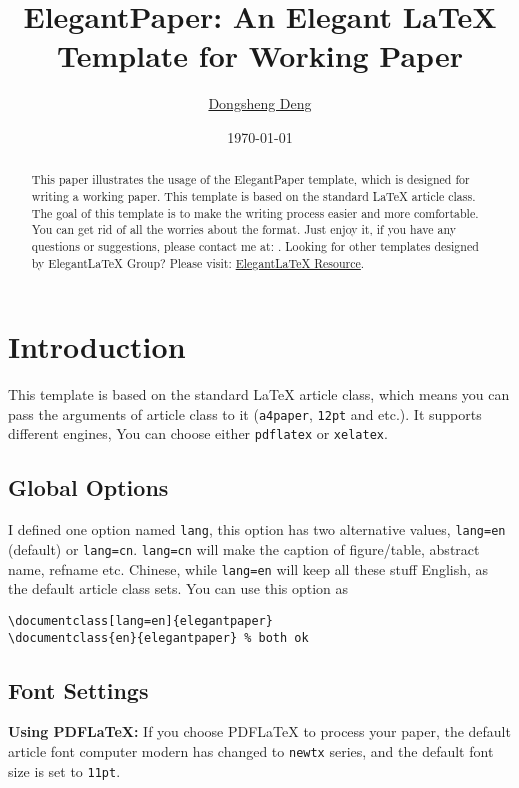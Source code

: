 \documentclass[en]{elegantpaper}
\title{ElegantPaper: An Elegant \LaTeX{} Template for Working Paper}
\author{\href{https://ddswhu.me/}{Dongsheng Deng}}
\institute{Elegant\LaTeX{} Program}
\date{\today}
\begin{document}
\maketitle

\begin{abstract}
	This paper illustrates the usage of the ElegantPaper template, which is designed for writing a working paper. This template is based on the standard \LaTeX{} article class. The goal of this template is to make the writing process easier and more comfortable. You can get rid of all the worries about the format. Just enjoy it, if you have any questions or suggestions, please contact me at: . Looking for other templates designed by Elegant\LaTeX{} Group? Please visit: \href{https://ddswhu.me/resource/}{Elegant\LaTeX{} Resource}.
\end{abstract}

\section{Introduction}

This template is based on the standard \LaTeX{} article class, which means you can pass the arguments of article class to it (\lstinline{a4paper}, \lstinline{12pt} and etc.). It supports different engines, You can choose either \lstinline{pdflatex} or \lstinline{xelatex}. 

\subsection{Global Options}
I defined one option named \lstinline{lang}, this option has two alternative values, \lstinline{lang=en} (default) or \lstinline{lang=cn}. \lstinline{lang=cn} will make the caption of figure/table, abstract name, refname etc. Chinese, while \lstinline{lang=en} will keep all these stuff English, as the default article class sets. You can use this option as

\begin{lstlisting}
\documentclass[lang=en]{elegantpaper}
\documentclass{en}{elegantpaper} % both ok
\end{lstlisting}

\subsection{Font Settings}
\noindent\textbf{Using PDFLaTeX:} If you choose PDFLaTeX to process your paper, the default article font computer modern has changed to \lstinline{newtx} series, and the default font size is set to \lstinline{11pt}.
\end{document}
